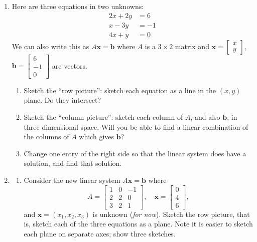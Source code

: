 \documentclass[11pt,fleqn]{article}
\newcommand{\bb}{\mathbf{b}}
\newcommand{\bx}{\mathbf{x}}
\begin{document}
\begin{enumerate}



\item  Here are three equations in two unknowns:
\begin{align*}
2 x + 2 y &= 6 \\
x - 3 y &= -1 \\
4 x + y &= 0
\end{align*}
We can also write this as $A \bx = \bb$ where $A$ is a $3\times 2$ matrix and $\bx = \begin{bmatrix} x \\ y \end{bmatrix}$, $\bb = \begin{bmatrix} 6 \\ -1 \\ 0 \end{bmatrix}$ are vectors.

	\begin{enumerate}
	\item Sketch the ``row picture'': sketch each equation as a line in the $(x,y)$ plane.  Do they intersect?

	\vfill
	\item Sketch the ``column picture'': sketch each column of $A$, and also $\bb$, in three-dimensional space.  Will you be able to find a linear combination of the columns of $A$ which gives $\bb$?

\vfill


	\item  Change one entry of the right side so that the linear system does have a solution, and find that solution.

\vspace{2.5in}
	\end{enumerate}
\item
	\begin{enumerate}
	 \item  Consider the new linear system $A\bx=\bb$ where
    $$A = \begin{bmatrix} 1 & 0 & -1 \\ 2 & 2 & 0 \\ 3 & 2 & 1 \end{bmatrix}, \quad \bx = \begin{bmatrix} 0 \\ 4 \\ 6 \end{bmatrix},$$
and $\bx = (x_1,x_2,x_3)$ is unknown (\emph{for now}).  Sketch the row picture, that is, sketch each of the three equations as a plane.  Note it is easier to sketch each plane on separate axes; show three sketches.
\vfill


\end{enumerate}
\end{enumerate}
\end{document}
